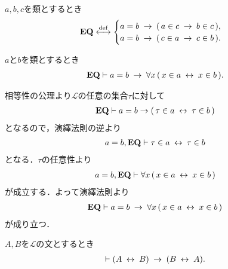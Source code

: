 	\begin{screen}
		\begin{axm}[相等性公理]
			$a,b,c$を類とするとき
			\begin{align}
				\mbox{{\bf EQ}} \overset{\mathrm{def}}{\longleftrightarrow}
				\begin{cases}
					a = b \hspace{0.25em}\rightarrow\hspace{0.25em} (\, a \in c \hspace{0.25em}\rightarrow\hspace{0.25em} b \in c\, ), & \\
					a = b \hspace{0.25em}\rightarrow\hspace{0.25em} (\, c \in a \hspace{0.25em}\rightarrow\hspace{0.25em} c \in b\, ). &
				\end{cases}
			\end{align}
		\end{axm}
	\end{screen}
	
	\begin{screen}
		\begin{thm}[外延性の公理の逆も成り立つ]
		\label{thm:axiom_of_extensionality_equivalent}
			$a$と$b$を類とするとき
			\begin{align}
				\mbox{{\bf EQ}} \vdash 
				a=b \hspace{0.25em}\rightarrow\hspace{0.25em} \forall x\, (\, x \in a  \hspace{0.25em}\leftrightarrow\hspace{0.25em} x \in b\, ).
			\end{align}
		\end{thm}
	\end{screen}
	
	\begin{prf}
		相等性の公理より$\mathcal{L}$の任意の集合$\tau$に対して
		\begin{align}
			\mbox{{\bf EQ}} \vdash a = b \rightarrow (\, \tau \in a \hspace{0.25em}\leftrightarrow\hspace{0.25em} \tau \in b\, )
		\end{align}
		となるので，演繹法則の逆より
		\begin{align}
			a = b, \mbox{{\bf EQ}} \vdash \tau \in a \hspace{0.25em}\leftrightarrow\hspace{0.25em} \tau \in b
		\end{align}
		となる．$\tau$の任意性より
		\begin{align}
			a = b, \mbox{{\bf EQ}} \vdash \forall x\, (\, x \in a  \hspace{0.25em}\leftrightarrow\hspace{0.25em} x \in b\, )
		\end{align}
		が成立する．よって演繹法則より
		\begin{align}
			\mbox{{\bf EQ}} \vdash a = b \hspace{0.25em}\rightarrow\hspace{0.25em} \forall x\, (\, x \in a  \hspace{0.25em}\leftrightarrow\hspace{0.25em} x \in b\, )
		\end{align}
		が成り立つ．
		\QED
	\end{prf}
	
	\begin{screen}
		\begin{logicalthm}[同値関係の対称律]
		\label{logicalthm:symmetry_of_equivalence_arrows}
			$A,B$を$\mathcal{L}$の文とするとき
			\begin{align}
				\vdash (A \hspace{0.25em}\leftrightarrow\hspace{0.25em} B) \hspace{0.25em}\rightarrow\hspace{0.25em} (B \hspace{0.25em}\leftrightarrow\hspace{0.25em} A).
			\end{align}
		\end{logicalthm}
	\end{screen}
	
